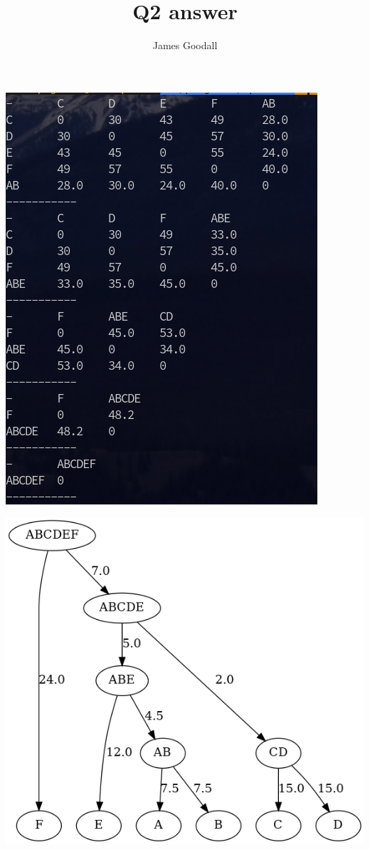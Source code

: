 \documentclass{article}
\title{Q2 answer}
\author{James Goodall}
\begin{document}
\maketitle

\includegraphics{working.png}

\includegraphics[width=\linewidth]{q2.png}
\end{document}
